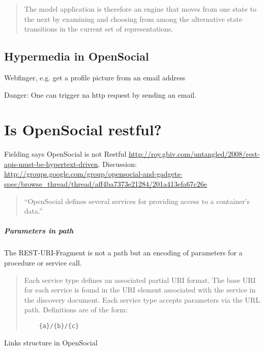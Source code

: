 \documentclass[12pt,a4paper]{scrartcl}		%
\begin{document}

\begin{quotation}
  The model application is therefore an engine that moves from one state to the next by examining and choosing from among the alternative state transitions in the current set of representations.
\end{quotation}\cite[sec. 5.3, p.103]{Fielding2000}

\subsection{Hypermedia in OpenSocial}

Webfinger, e.g. get a profile picture from an email address

Danger: One can trigger na http request by sending an email.

\section{Is OpenSocial restful?}

Fielding says OpenSocial is not Restful \url{http://roy.gbiv.com/untangled/2008/rest-apis-must-be-hypertext-driven}. Discussion: \url{http://groups.google.com/group/opensocial-and-gadgets-spec/browse_thread/thread/aff4ba7373e21284/201a413efa67c26e}


\begin{quote}
  ``OpenSocial defines several services for providing access to a container's data.''
\end{quote}\cite[Social API Server, sec 2, Services]{OSSpec2.0.1}


\subparagraph{Parameters in path}
The REST-URI-Fragment is not a path but an encoding of parameters for a procedure or service call.

\begin{quote}
  Each service type defines an associated partial URI format. The base URI for each service is found in the URI element associated with the service in the discovery document. Each service type accepts parameters via the URL path. Definitions are of the form:
  \begin{verbatim}
    {a}/{b}/{c}
  \end{verbatim}
\end{quote}\cite[Core API Server, sec 2.1.1.2.2, REST-URI-Fragment]{OSSpec2.0.1}

Links structure in OpenSocial
\begin{verbatim}
  
\end{verbatim}
\end{document}
